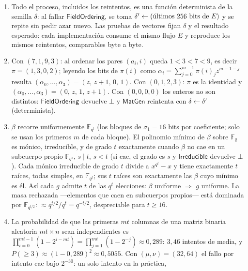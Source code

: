 \documentclass[11pt,a4paper,oneside]{report}
\newcommand{\GF}[1]{\mathbb{F}_{#1}}
\begin{document}
\begin{enumerate}[leftmargin=1.9em,itemsep=4pt]
  \item Todo el proceso, incluidos los reintentos, es una función
        determinista de la semilla $\delta$: al fallar
        $\textsf{FieldOrdering}$, se toma $\delta'\leftarrow
        \textnormal{(últimos $256$ bits de }E)$ y se repite sin pedir
        azar nuevo. Las pruebas de vectores fijan $\delta$ y el
        resultado esperado: cada implementación consume el mismo flujo
        $E$ y reproduce los mismos reintentos, comparables byte a
        byte.
  \item Con $(7,1,9,3)$: al ordenar los pares $(a_i,i)$ queda
        $1<3<7<9$, es decir $\pi=(1,3,0,2)$; leyendo los bits de
        $\pi(i)$ como $\alpha_i=\sum_{j=0}^{m-1}\pi(i)_jz^{m-1-j}$
        resulta $(\alpha_0,\dots,\alpha_3)=(z,\,z+1,\,0,\,1)$. Con
        $(0,1,2,3)$: $\pi$ es la identidad
        y $(\alpha_0,\dots,\alpha_3)=(0,\,z,\,1,\,z+1)$. Con
        $(0,0,0,0)$ los enteros no son distintos:
        $\textsf{FieldOrdering}$ devuelve $\bot$ y
        $\textsf{MatGen}$ reintenta con $\delta\leftarrow\delta'$
        (determinista).
  \item $\beta$ recorre uniformemente $\GF{q^t}$ (los bloques de
        $\sigma_1=16$ bits por coeficiente; solo se usan los primeros
        $m$ de cada bloque). El polinomio mínimo de $\beta$ sobre
        $\GF q$ es mónico, irreducible, y de grado $t$ exactamente
        cuando $\beta$ no cae en un subcuerpo propio
        $\GF{q^s}$, $s\mid t$, $s<t$ (si cae, el grado es $s$ y
        $\textsf{Irreducible}$ devuelve $\bot$). Cada mónico
        irreducible de grado $t$ divide a $x^{q^t}-x$ y tiene
        exactamente $t$ raíces, todas simples, en $\GF{q^t}$; sus
        $t$ raíces son exactamente las $\beta$ cuyo mínimo es él. Así
        cada $g$ admite $t$ de las $q^t$ elecciones: $\beta$
        uniforme $\Rightarrow$ $g$ uniforme. La masa rechazada
        ---elementos que caen en subcuerpos propios--- está dominada
        por $\GF{q^{t/2}}$: $\approx q^{t/2}/q^t=q^{-t/2}$,
        despreciable para $t\ge16$.
  \item La probabilidad de que las primeras $mt$ columnas de una
        matriz binaria aleatoria $mt\times n$ sean independientes es
        $\prod_{i=0}^{mt-1}(1-2^{i-mt})
        =\prod_{j=1}^{mt}(1-2^{-j})\approx0{,}289$:
        $3{,}46$ intentos de media, y $P(\ge3)\approx(1-0{,}289)^2
        \approx0{,}5055$. Con $(\mu,\nu)=(32,64)$ el fallo por
        intento cae bajo $2^{-30}$: un solo intento en la práctica,

\end{enumerate}
\end{document}
